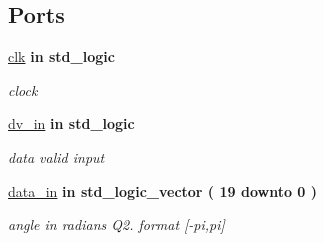 \subsection*{Ports}
 \begin{DoxyCompactItemize}
\item 
\mbox{\label{classcordic__sincos__engine_a4a4609c199d30b3adebbeb3a01276ec5}} 
\hyperlink{classcordic__sincos__engine_a4a4609c199d30b3adebbeb3a01276ec5}{clk}  {\bfseries {\bfseries \textcolor{vhdlchar}{in}\textcolor{vhdlchar}{ }}} {\bfseries \textcolor{vhdlchar}{std\+\_\+logic}\textcolor{vhdlchar}{ }} 
\begin{DoxyCompactList}\small\item\em clock \end{DoxyCompactList}\item 
\mbox{\label{classcordic__sincos__engine_a4d76e4563200e6081ff08453e0301dd9}} 
\hyperlink{classcordic__sincos__engine_a4d76e4563200e6081ff08453e0301dd9}{dv\+\_\+in}  {\bfseries {\bfseries \textcolor{vhdlchar}{in}\textcolor{vhdlchar}{ }}} {\bfseries \textcolor{vhdlchar}{std\+\_\+logic}\textcolor{vhdlchar}{ }} 
\begin{DoxyCompactList}\small\item\em data valid input \end{DoxyCompactList}\item 
\mbox{\label{classcordic__sincos__engine_a2a9f1cf8d289610b193afcd0a191b448}} 
\hyperlink{classcordic__sincos__engine_a2a9f1cf8d289610b193afcd0a191b448}{data\+\_\+in}  {\bfseries {\bfseries \textcolor{vhdlchar}{in}\textcolor{vhdlchar}{ }}} {\bfseries \textcolor{vhdlchar}{std\+\_\+logic\+\_\+vector}\textcolor{vhdlchar}{ }\textcolor{vhdlchar}{(}\textcolor{vhdlchar}{ }\textcolor{vhdlchar}{ } \textcolor{vhdldigit}{19} \textcolor{vhdlchar}{ }\textcolor{vhdlchar}{downto}\textcolor{vhdlchar}{ }\textcolor{vhdlchar}{ } \textcolor{vhdldigit}{0} \textcolor{vhdlchar}{ }\textcolor{vhdlchar}{)}\textcolor{vhdlchar}{ }} 
\begin{DoxyCompactList}\small\item\em angle in radians Q2. format \mbox{[}-\/pi,pi\mbox{]} \end{DoxyCompactList}\item 
\mbox{\label{classcordic__sincos__engine_a5a291fb791fb54f72f5cda34a8f18fcc}} 

\end{DoxyCompactItemize}

